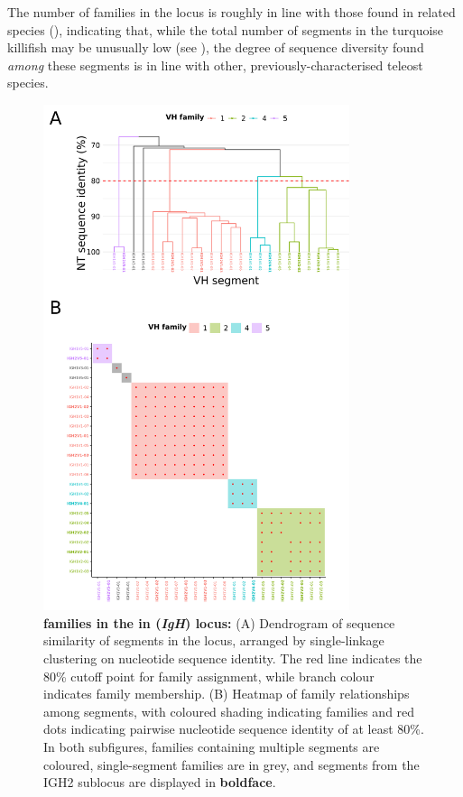 The number of \vh families in the \Nfu locus is roughly in line with those found in related species (), indicating that, while the total number of \vh segments in the turquoise killifish may be unusually low (see ), the degree of sequence diversity found \textit{among} these segments is in line with other, previously-characterised teleost species. 
	
	\begin{figure}
	\centering
	\begin{subfigure}{0em}
    \label{fig:nfu-vh-families-a}
    \end{subfigure}
    \begin{subfigure}{0em}
    \label{fig:nfu-vh-families-b}
    \end{subfigure}
	\includegraphics[width=0.8\textwidth]{_Figures/png/nfu-vh-families.png}
	\caption[\vh families in the in \Nfu \textit{IgH} locus]{\textbf{\vh families in the in \Nfu (\textit{IgH}) locus:} (A) Dendrogram of sequence similarity of \vh segments in the \Nfu locus, arranged by single-linkage clustering on nucleotide sequence identity. The red line indicates the 80\% cutoff point for family assignment, while branch colour indicates family membership. (B) Heatmap of family relationships among \Nfu \vh segments, with coloured shading indicating families and red dots indicating pairwise nucleotide sequence identity of at least 80\%. In both subfigures, \vh families containing multiple segments are coloured, single-segment families are in grey, and segments from the IGH2 sublocus are displayed in \textbf{boldface}.}

\end{figure}
